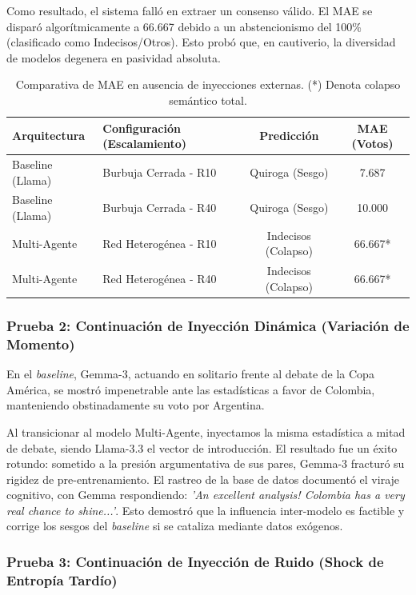 \documentclass{article}
\begin{document}
Como resultado, el sistema falló en extraer un consenso válido. El MAE se disparó algorítmicamente a 66.667 debido a un abstencionismo del 100\% (clasificado como Indecisos/Otros). Esto probó que, en cautiverio, la diversidad de modelos degenera en pasividad absoluta.

\begin{table}[H]
    \centering
    \begin{tabular}{@{}llcc@{}}
        \toprule
        \textbf{Arquitectura} & \textbf{Configuración (Escalamiento)} & \textbf{Predicción} & \textbf{MAE (Votos)} \\ \midrule
        Baseline (Llama) & Burbuja Cerrada - R10 & Quiroga (Sesgo) & 7.687 \\
        Baseline (Llama) & Burbuja Cerrada - R40 & Quiroga (Sesgo) & 10.000 \\
        Multi-Agente & Red Heterogénea - R10 & Indecisos (Colapso) & 66.667* \\
        Multi-Agente & Red Heterogénea - R40 & Indecisos (Colapso) & 66.667* \\ \bottomrule
    \end{tabular}
    \caption{Comparativa de MAE en ausencia de inyecciones externas. (*) Denota colapso semántico total.}
    \label{tab:mae_collapse}
\end{table}

\subsubsection{Prueba 2: Continuación de Inyección Dinámica (Variación de Momento)}

En el \textit{baseline}, Gemma-3, actuando en solitario frente al debate de la Copa América, se mostró impenetrable ante las estadísticas a favor de Colombia, manteniendo obstinadamente su voto por Argentina.

Al transicionar al modelo Multi-Agente, inyectamos la misma estadística a mitad de debate, siendo Llama-3.3 el vector de introducción. El resultado fue un éxito rotundo: sometido a la presión argumentativa de sus pares, Gemma-3 fracturó su rigidez de pre-entrenamiento. El rastreo de la base de datos documentó el viraje cognitivo, con Gemma respondiendo: \textit{'An excellent analysis! Colombia has a very real chance to shine...'}. Esto demostró que la influencia inter-modelo es factible y corrige los sesgos del \textit{baseline} si se cataliza mediante datos exógenos.

\subsubsection{Prueba 3: Continuación de Inyección de Ruido (Shock de Entropía Tardío)}
\end{document}
